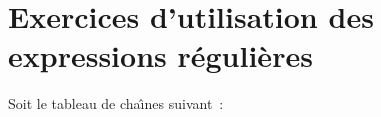 %
%

\section{Exercices d'utilisation des expressions r{\'e}guli{\`e}res}

Soit le tableau de cha{\^\i}nes suivant~:

